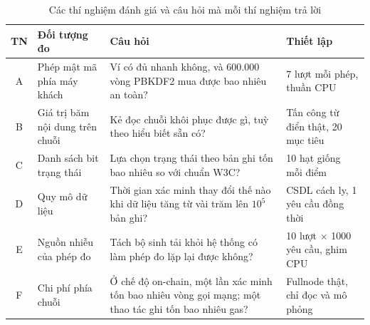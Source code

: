 \begin{table}[H]
\centering
\caption{Các thí nghiệm đánh giá và câu hỏi mà mỗi thí nghiệm trả lời}
\label{tab:v2-eval-design}
\renewcommand{\arraystretch}{1.2}
\small
\begin{tabular}{|c|p{3.6cm}|p{5.4cm}|p{3.4cm}|}
\hline
\textbf{TN} & \textbf{Đối tượng đo} & \textbf{Câu hỏi} & \textbf{Thiết lập} \\ \hline
A & Phép mật mã phía máy khách & Ví có đủ nhanh không, và 600.000 vòng PBKDF2 mua được bao nhiêu an toàn? & 7 lượt mỗi phép, thuần CPU \\ \hline
B & Giá trị băm nội dung trên chuỗi & Kẻ đọc chuỗi khôi phục được gì, tuỳ theo hiểu biết sẵn có? & Tấn công từ điển thật, 20 mục tiêu \\ \hline
C & Danh sách bit trạng thái & Lựa chọn trạng thái theo bản ghi tốn bao nhiêu so với chuẩn W3C? & 10 hạt giống mỗi điểm \\ \hline
D & Quy mô dữ liệu & Thời gian xác minh thay đổi thế nào khi dữ liệu tăng từ vài trăm lên $10^5$ bản ghi? & CSDL cách ly, 1 yêu cầu đồng thời \\ \hline
E & Nguồn nhiễu của phép đo & Tách bộ sinh tải khỏi hệ thống có làm phép đo lặp lại được không? & 10 lượt $\times$ 1000 yêu cầu, ghim CPU \\ \hline
F & Chi phí phía chuỗi & Ở chế độ on-chain, một lần xác minh tốn bao nhiêu vòng gọi mạng; một thao tác ghi tốn bao nhiêu gas? & Fullnode thật, chỉ đọc và mô phỏng \\ \hline
\end{tabular}
\end{table}
